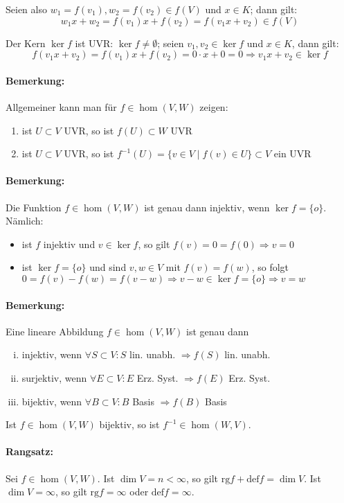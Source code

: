 	Seien also $w_1 = f(v_1), w_2 = f(v_2) \in f(V)$ und $x\in K$; dann gilt:
		\begin{equation*}
			w_1x+w_2 = f(v_1)x+f(v_2) = f(v_1x+v_2)\in f(V)
		\end{equation*}
		
	Der Kern $\ker f$ ist UVR: $\ker f\neq \emptyset$; seien $v_1,v_2\in \ker f$ und $x\in K$, dann gilt:
		\begin{equation*}
			f(v_1x+v_2) = f(v_1)x+f(v_2) = 0\cdot x + 0 = 0 \Rightarrow v_1x+v_2\in \ker f
		\end{equation*}
\paragraph{Bemerkung: }
	Allgemeiner kann man für $f\in \hom (V,W)$ zeigen:
		\begin{enumerate}
			\item ist $U\subset V$ UVR, so ist $f(U)\subset W$ UVR
			\item ist $U\subset V$ UVR, so ist $f^{-1}(U) = \{v\in V\mid f(v) \in U \}\subset V$ ein UVR
		\end{enumerate}
		
\paragraph{Bemerkung: }
	Die Funktion $f\in \hom (V,W)$ ist genau dann injektiv, wenn $\ker f = \{o\}$. Nämlich:
		\begin{itemize}
			\item ist $f$ injektiv und $v\in \ker f$, so gilt $f(v) = 0 = f(0) \Rightarrow v=0$
			\item ist $\ker f = \{ o \}$ und sind $v,w \in V$ mit $f(v) = f(w)$, so folgt\\
				$0=f(v)-f(w) = f(v-w) \Rightarrow v-w\in \ker f = \{o\} \Rightarrow v = w$
		\end{itemize}

\paragraph{Bemerkung: }
	Eine lineare Abbildung $ f\in \hom (V,W) $ ist genau dann
		\begin{enumerate}[(i)]
			\item injektiv, wenn $ \forall S\subset V: S$ lin. unabh. $ \Rightarrow f(S) $ lin. unabh.
			\item surjektiv, wenn $ \forall E \subset V:E $ Erz. Syst. $ \Rightarrow f(E)$ Erz. Syst.
			\item bijektiv, wenn $ \forall B\subset V: B$ Basis $ \Rightarrow f(B)$ Basis
		\end{enumerate}

	Ist $ f\in \hom (V,W) $ bijektiv, so ist $ f^{-1}\in \hom (W,V) $.
\paragraph{Rangsatz: }
	Sei $ f\in \hom (V,W) $. Ist $ \dim V = n < \infty $,  so gilt $\text{rg} f + \text{def} f = \dim V$.  Ist $ \dim V = \infty $, so gilt $ \text{rg} f = \infty $ oder $ \text{def} f = \infty $.
